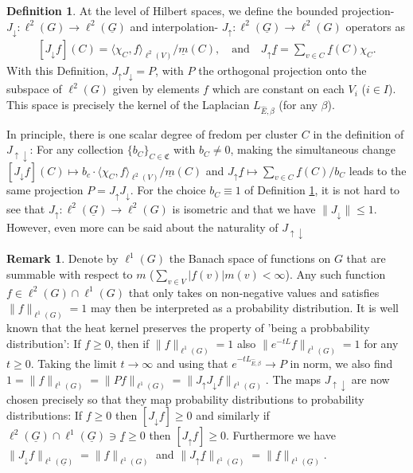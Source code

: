 \documentclass[reqno,12pt,letterpaper]{amsart}
\numberwithin{equation}{section}
\newcommand{\1}{\mathds{1}}
\theoremstyle{definition}
\newtheorem{Def}[Th]{Definition}
\newtheorem{Rem}[Th]{Remark}
\begin{document}
 
 \begin{Def}\label{proj_interp_undirected}
 	At the level of Hilbert spaces, we define the bounded projection- $J_\downarrow: \ell^2(G) \rightarrow \ell^2(\underline{G})$ and interpolation- $J_\uparrow: \ell^2(\underline{G}) \rightarrow \ell^2(G)$ operators as 
 	\begin{align}\label{undirected_Js}
 		[J_\downarrow f](C) = \langle \chi_{C}, f \rangle_{\ell^2(V)}/\underline{m}(C),\quad \text{and} \quad J_\uparrow \underline{f} = \sum_{v \in C} \underline{f}(C) \chi_{C}.
 	\end{align}
 With this Definition, $J_\uparrow J_{\downarrow}= P$, with $P$ the orthogonal projection onto the subspace of $\ell^2(G)$ given by elements $f$ which are constant on each $V_i$ ($i \in I$). This space is precisely the kernel of the Laplacian $L_{\hat{E},\beta}$ (for any $\beta$).
 \end{Def}

 
 In principle, there is one scalar degree of fredom per cluster $C$ in the definition of $J_{\uparrow\downarrow}$: For any collection $\{b_C\}_{C \in \mathfrak{C}}$ with    $b_C \neq 0$, making the simultaneous change $[J_\downarrow f](C) \mapsto b_c \cdot \langle \chi_{C}, f \rangle_{\ell^2(V)}/\underline{m}(C)$ and  $J_\uparrow \underline{f} \mapsto \sum_{v \in C} \underline{f}(C)/b_C$   leads to the same projection $P = J_\uparrow J_\downarrow $.
For the choice $b_C \equiv 1$ of Definition \ref{proj_interp_undirected}, it is not hard to see that $J_\uparrow: \ell^2(\underline{G}) \rightarrow \ell^2(G) $ is isometric and that we have $\|J_\downarrow\| \leq 1$.  However, even more can be said about the naturality of $J_{\uparrow \downarrow}$

\begin{Rem}
	 Denote by $\ell^1(G)$ the Banach space of functions on $G$ that are summable  with respect to $m$ ($\sum_{v \in V} |f(v)| m(v) < \infty$). Any such function $f \in \ell^2(G) \cap \ell^1(G)$ that only takes on non-negative values  and satisfies $\|f\|_{\ell^1(G)} = 1$ may then be interpreted as a probability distribution. It is well known that the heat kernel preserves the property of 'being a probbability distribution': If $f \geq 0$, then if $\|f\|_{\ell^1(G)} = 1$ also  $\|e^{-tL}f\|_{\ell^1(G)} = 1$ for any $t \geq 0$. Taking the limit $t \rightarrow \infty$ and using that $e^{-tL_{\hat{E},\beta}} \rightarrow P$ in norm, we also find $ 1 = \|f\|_{\ell^1(G)} = \|Pf\|_{\ell^1(G)} = \|J_\uparrow J_\downarrow f\|_{\ell^1(G)} $. The maps $J_{\uparrow \downarrow} $ are now chosen precisely so that  they map probability distributions to probability distributions: If $f \geq 0$ then $[J_\downarrow f] \geq 0$ and similarly if $\ell^2(\underline{G}) \cap \ell^1(\underline{G}) \ni \underline{f} \geq 0$ then $[J_\uparrow f] \geq 0$.  Furthermore we have $\|J_\downarrow f\|_{\ell^1(\underline{G})} = \|f\|_{\ell^1(G)}$ and 
	 $ \|J_\uparrow \underline{f}\|_{\ell^1(G)}  = \| \underline{f}\|_{\ell^1(\underline{G})} $.
\end{Rem}
\end{document}
